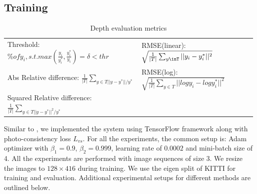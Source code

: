 \documentclass[10pt,twocolumn,letterpaper]{article}
\begin{document}
\subsection{Training}

\begin{table}
\centering
\begin{tabular}{l|l}
 Threshold: $\% of y_i, s.t. max(\frac{y_i}{y_i^*}, \frac{y_i^*}{y_i})=\delta < thr $&  RMSE(linear):$\sqrt{\frac{1}{|T|}\sum_{y\inT}||y_i - y_i^*||^2}$ \\
 Abs Relative difference: $\frac{1}{|T|}\sum_{y\in T||y-y^*||/y^*}$ &  RMSE(log):$\sqrt{\frac{1}{|T|}\sum_{y \in T}||log y_i - log y_i^*||^2}$ \\
 Squared Relative difference:$\frac{1}{|T|}\sum_{y\in T||y-y^*||^2/y^*}$ & 
\end{tabular}
\caption{Depth evaluation metrics}\label{table1:depth_eval}
\end{table}

Similar to \cite{zhou2017unsupervised}, we implemented the system using TensorFlow framework along with photo-consistency loss $L_{vs}$. For all the experiments, the common setup is: Adam optimizer with $\beta_1 = 0.9$, $\beta_2 = 0.999$, learning rate of $0.0002$ and mini-batch size of 4. All the experiments are performed with image sequences of size 3. We resize the images to $128 \times 416$ during training. We use the eigen split of KITTI for training and evaluation. Additional experimental setups for different methods are outlined below.

\end{document}
